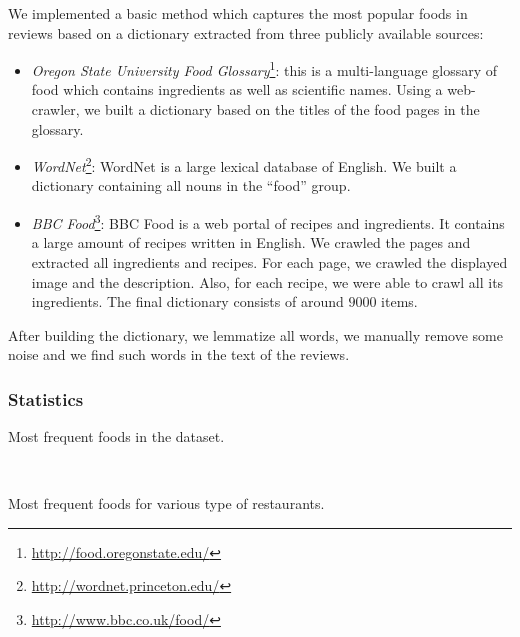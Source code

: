 We implemented a basic method which captures the most popular foods in reviews based on a dictionary extracted from three publicly available sources:
\begin{itemize}
	\item
	\emph{Oregon State University Food Glossary}\footnote{\url{http://food.oregonstate.edu/}}: this is a multi-language glossary of food which contains ingredients as well as scientific names. Using a web-crawler, we built a dictionary based on the titles of the food pages in the glossary.
	\item
	\emph{WordNet}\footnote{\url{http://wordnet.princeton.edu/}}: WordNet is a large lexical database of English. We built a dictionary containing all nouns in the ``food'' group. 
	\item
	\emph{BBC Food}\footnote{\url{http://www.bbc.co.uk/food/}}: BBC Food is a web portal of recipes and ingredients. It contains a large amount of recipes written in English. We crawled the pages and extracted all ingredients and recipes. For each page, we crawled the displayed image and the description. Also, for each recipe, we were able to crawl all its ingredients. The final dictionary consists of around $9000$ items.
\end{itemize}

After building the dictionary, we lemmatize all words, we manually remove some noise and we find such words in the text of the reviews.

\subsubsection{Statistics}
\begin{table}
\begin{center}
\caption{Most frequent foods in the dataset.}
\label{tab:food}
\end{center}
\end{table}

\begin{table}
\begin{center}
	\quad
	\\[0.5cm]
	\quad
\caption{Most frequent foods for various type of restaurants.}
\label{tab:food_by_category}
\end{center}
\end{table}

